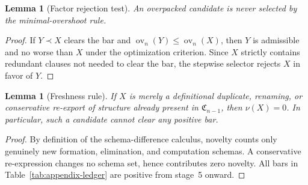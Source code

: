 \documentclass{lmcs}
\theoremstyle{plain}
\newtheorem{lem}[thm]{Lemma}
\theoremstyle{definition}
\theoremstyle{remark}
\newcommand{\Core}{\ensuremath{\mathfrak{C}}}
\newcommand{\ov}{\ensuremath{\operatorname{ov}}}
\begin{document}
\begin{lem}[Factor rejection test]
\label{lem:factor-test}
An overpacked candidate is never selected by the minimal-overshoot rule.
\end{lem}

\begin{proof}
If $Y\prec X$ clears the bar and $\ov_n(Y)\le \ov_n(X)$, then $Y$ is admissible and no worse than $X$ under the optimization criterion.
Since $X$ strictly contains redundant clauses not needed to clear the bar, the stepwise selector rejects $X$ in favor of $Y$.
\end{proof}

\begin{lem}[Freshness rule]
\label{lem:freshness}
If $X$ is merely a definitional duplicate, renaming, or conservative re-export of structure already present in $\Core_{n-1}$, then $\nu(X)=0$.
In particular, such a candidate cannot clear any positive bar.
\end{lem}

\begin{proof}
By definition of the schema-difference calculus, novelty counts only genuinely new formation, elimination, and computation schemas.
A conservative re-expression changes no schema set, hence contributes zero novelty.
All bars in Table~\ref{tab:appendix-ledger} are positive from stage~5 onward.
\end{proof}
\end{document}
